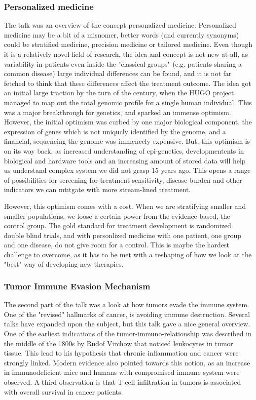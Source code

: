 \documentclass[12p]{article}
\begin{document}
\subsubsection*{Personalized medicine}

The talk was an overview of the concept personalized medicine.
Personalized medicine may be a bit of a misnomer, better words (and currently synonyms) could be stratified medicine, precision medicine or tailored medicine.
Even though it is a relatively novel field of research, the idea and concept is not new at all, as variability in patients even inside the "classical groups" (e.g. patients sharing a common disease) large individual differences can be found, and it is not far fetched to think that these differences affect the treatment outcome.
The idea got an initial large traction by the turn of the century, when the HUGO project managed to map out the total genomic profile for a single human individual.
This was a major breakthrough for genetics, and sparked an immense optimism.
However, the initial optimism was curbed by one major biological component, the expression of genes which is not uniqucly identified by the genome, and a financial, sequencing the genome was immencely expensive.
But, this optimism is on its way back, as increased understanding of epi-genetics, developmentents in biological and hardware tools and an increasing amount of stored data will help us understand complex system we did not grasp 15 years ago.
This opens a range of possibilities for screening for treatment sensitivity, disease burden and other indicators we can mtitgate with more stream-lined treatment.

However, this optimism comes with a cost.
When we are stratifying smaller and smaller populations, we loose a certain power from the evidence-based, the control group.
The gold standard for treatment development is randomized double blind trials, and with personlized medicine with one patient, one group and one disease, do not give room for a control.
This is maybe the hardest challenge to overcome, as it has to be met with a reshaping of how we look at the "best" way of developing new therapies.

\subsubsection*{Tumor Immune Evasion Mechanism}

The second part of the talk was a look at how tumors evade the immune system.
One of the "revised" hallmarks of cancer, is avoiding immune destruction.
Several talks have expanded upon the subject, but this talk gave a nice general overview.
One of the earliest indications of the tumor-immuno-relationship was described in the middle of the 1800s by Rudof Virchow that noticed leukocytes in tumor tissue.
This lead to his hypothesis that chronic inflammation and cancer were strongly linked.
Modern evidence also pointed towards this notion, as an increase in immunodeficient mice and humans with compromised immune system were observed.
A third observation is that T-cell infiltration in tumors is associated with overall survival in cancer patients.
\end{document}
